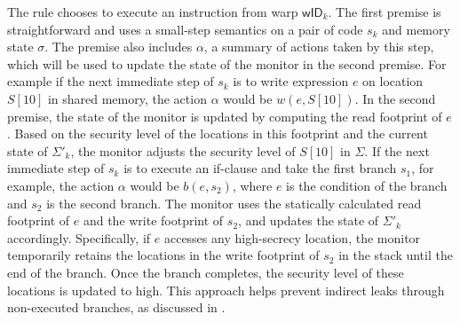 {\small\begin{mathpar}
\end{mathpar}
}
The rule chooses to execute an instruction from warp $\mathsf{wID}_k$. 
%
The first premise is straightforward and uses a small-step semantics on a pair of code $s_k$ and memory state $\sigma$.
%
The premise also includes $\alpha$, a summary of actions taken by this step,
which will be used to update the state of the monitor in the second premise.
%
For example if the next immediate step of $s_k$ is to write expression $e$ on location $S[10]$ in shared memory, the action $\alpha$ would be $w(e, S[10])$. In the second premise, the state of the monitor is updated by computing the read footprint of $e$. Based on the security level of the locations in this footprint and the current state of $\Sigma'_k$, the monitor adjusts the security level of $S[10]$ in $\Sigma$. 
%
If the next immediate step of $s_k$ is to execute an if-clause and take the first branch $s_1$, for example, the action $\alpha$ would be $b(e, s_2)$, where $e$ is the condition of the branch and $s_2$ is the second branch.
%
The monitor uses the statically calculated read footprint of $e$ and the write footprint of $s_2$, and updates the state of $\Sigma'_k$ accordingly.
%
Specifically, if $e$ accesses any high-secrecy location, the monitor temporarily retains the locations in the write footprint of $s_2$ in the stack until the end of the branch. Once the branch completes, the security level of these locations is updated to high.
%
This approach helps prevent indirect leaks through non-executed branches, as discussed in \cite{russo2010CSF}.


